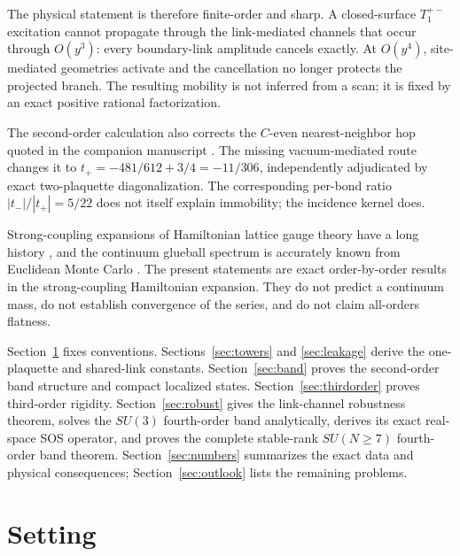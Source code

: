 \documentclass[11pt]{article}
\begin{document}
The physical statement is therefore finite-order and sharp. A closed-surface
$T_1^{+-}$ excitation cannot propagate through the link-mediated channels
that occur through $O(y^3)$: every boundary-link amplitude cancels exactly.
At $O(y^4)$, site-mediated geometries activate and the cancellation no longer
protects the projected branch. The resulting mobility is not inferred from a
scan; it is fixed by an exact positive rational factorization.

The second-order calculation also corrects the $C$-even nearest-neighbor hop
quoted in the companion manuscript \cite{companion}. The missing
vacuum-mediated route changes it to
$t_+=-481/612+3/4=-11/306$, independently adjudicated by exact
two-plaquette diagonalization. The corresponding per-bond ratio
$|t_-|/|t_+|=5/22$ does not itself explain immobility; the incidence kernel
does.

Strong-coupling expansions of Hamiltonian lattice gauge theory have a long
history \cite{KogutSusskind1975,Banksetal1977,KogutSinclairSusskind1976,
Creutz1983}, and the continuum glueball spectrum is accurately known from
Euclidean Monte Carlo \cite{MorningstarPeardon1999,AthenodorouTeper2020}.
The present statements are exact order-by-order results in the
strong-coupling Hamiltonian expansion. They do not predict a continuum mass,
do not establish convergence of the series, and do not claim all-orders
flatness.

Section~\ref{sec:setting} fixes conventions. Sections~\ref{sec:towers} and
\ref{sec:leakage} derive the one-plaquette and shared-link constants.
Section~\ref{sec:band} proves the second-order band structure and compact
localized states. Section~\ref{sec:thirdorder} proves third-order rigidity.
Section~\ref{sec:robust} gives the link-channel robustness theorem, solves the
$SU(3)$ fourth-order band analytically, derives its exact real-space SOS
operator, and proves the complete stable-rank
$SU(N\geq7)$ fourth-order band theorem. Section~\ref{sec:numbers}
summarizes the exact data and physical consequences; Section~\ref{sec:outlook}
lists the remaining problems.

\section{Setting}
\label{sec:setting}
\end{document}
